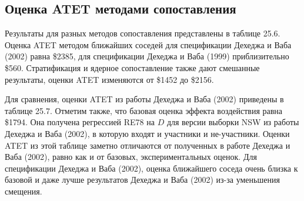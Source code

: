 \subsection*{Оценка ATET методами сопоставления}

Результаты для разных методов сопоставления представлены в таблице 25.6. Оценка ATET методом ближайших соседей для спецификации Дехеджа и Ваба (2002) равна \$2385, для спецификации Дехеджа и Ваба (1999) приблизительно \$560. Стратификация и ядерное сопоставление также дают смешанные результаты, оценки ATET изменяются от \$1452 до \$2156. 

Для сравнения, оценки ATET из работы Дехеджа и Ваба (2002) приведены в таблице 25.7. Отметим также, что базовая оценка эффекта воздействия равна \$1794. Она получена регрессией RE78 на $D$ для версии выборки NSW из работы Дехеджа и Ваба (2002), в которую входят и участники и не-участники. Оценки ATET из этой таблице заметно отличаются от полученных в работе Дехеджа и Ваба (2002), равно как и от базовых, экспериментальных оценок. Для спецификации Дехеджа и Ваба (2002), оценка ближайшего соседа очень близка к базовой и даже лучше результатов Дехеджа и Ваба (2002) из-за уменьшения смещения. 


